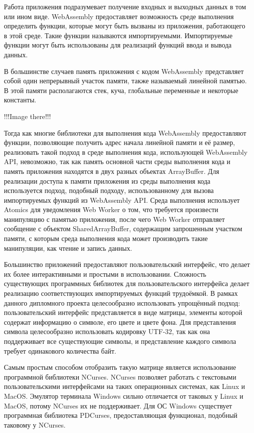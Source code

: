 Работа приложения подразумевает получение входных и выходных данных в том или ином виде.
WebAssembly предоставляет возможность среде выполнения определить функции, которые могут быть вызваны из приложения, работающего в этой среде.
Такие функции называются импортируемыми.
Импортируемые функции могут быть использованы для реализаций функций ввода и вывода данных.

В большинстве случаев память приложения с кодом WebAssembly представляет собой один непрерывный участок памяти, также называемый линейной памятью.
В этой памяти располагаются стек, куча, глобальные переменные и некоторые константы.

!!!Image there!!!

Тогда как многие библиотеки для выполнения кода WebAssembly предоставляют функции, позволяющие получить адрес начала линейной памяти и её размер, реализовать такой подход в среде выполнения кода, использующей WebAssembly API, невозможно, так как память основной части среды выполнения кода и память приложения находятся в двух разных объектах ArrayBuffer. 
Для реализации доступа к памяти приложения из среды выполнения кода используется подход, подобный подходу, использованному для вызова импортируемых функций из WebAssembly API.
Среда выполнения использует Atomics для уведомления Web Worker о том, что требуется произвести манипуляцию с памятью приложения, после чего Web Worker отправляет сообщение с объектом SharedArrayBuffer, содержащим запрошенным участком памяти, с которым среда выполнения кода может производить такие манипуляции, как чтение и запись данных.

Большинство приложений предоставляют пользовательский интерфейс, что делает их более интерактивными и простыми в использовании.
Сложность существующих программных библиотек для пользовательского интерфейса делает реализацию соответствующих импортируемых функций трудоёмкой.
В рамках данного дипломного проекта целесообразно использовать упрощённый подход: пользовательский интерфейс представляется в виде матрицы, элементы которой содержат информацию о символе, его цвете и цвете фона.
Для представления символа целесообразно использовать кодировку UTF-32, так как она поддерживает все существующие символы, и представление каждого символа требует одинакового количества байт.

Самым простым способом отобразить такую матрице является использование программной библиотеки NCurses.
NCurses позволяет работать с текстовыми пользовательскими интерфейсами на таких операционных системах, как Linux и MacOS.
Эмулятор терминала Windows сильно отличается от таковых у Linux и MacOS, потому NCurses их не поддерживает.
Для ОС Windows существует программная библиотека PDCurses, предоставляющая функционал, подобный таковому у NCurses.

